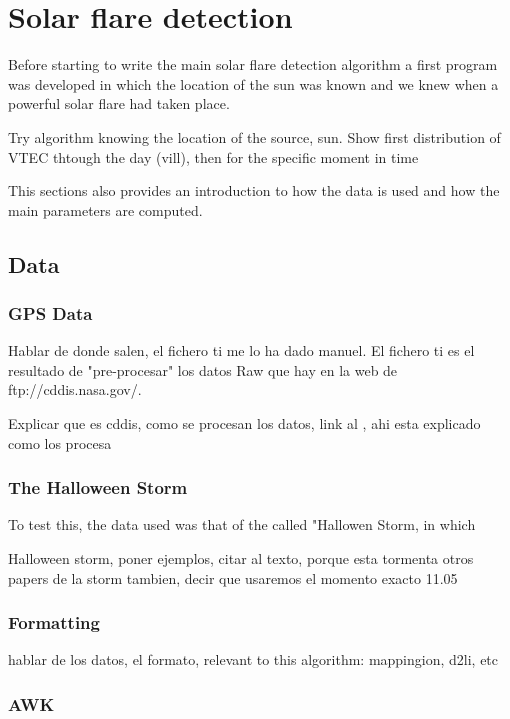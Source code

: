 \chapter{Solar flare detection}

Before starting to write the main solar flare detection algorithm a first program was developed in which the location of the sun was known and we knew when a powerful solar flare had taken place.

Try algorithm knowing the location of the source, sun. Show first distribution of VTEC thtough the day (vill), then for the specific moment in time

This sections also provides an introduction to how the data is used and how the main parameters are computed.

\section{Data}

\subsection{GPS Data}

Hablar de donde salen, el fichero ti me lo ha dado manuel. El fichero ti es el resultado de "pre-procesar" los datos Raw que hay en la web de ftp://cddis.nasa.gov/.

Explicar que es cddis, como se procesan los datos, link al \cite{hernandez2009igs}, ahi esta explicado como los procesa

\subsection{The Halloween Storm}

To test this, the data used was that of the called "Hallowen Storm, in which 

Halloween storm, poner ejemplos, citar al texto, porque esta tormenta otros papers de la storm tambien, decir que usaremos el momento exacto 11.05

\subsection{Formatting}
hablar de los datos, el formato, relevant to this algorithm: mappingion, d2li, etc

\subsection{AWK}

